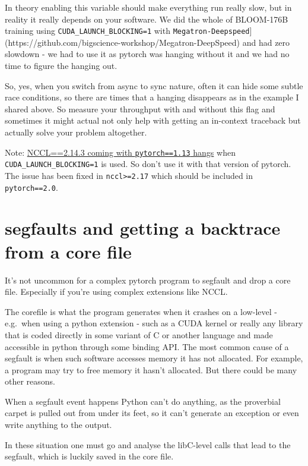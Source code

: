 \documentclass[
]{report}
\begin{document}
In theory enabling this variable should make everything run really slow,
but in reality it really depends on your software. We did the whole of
BLOOM-176B training using \texttt{CUDA\_LAUNCH\_BLOCKING=1} with
\texttt{Megatron-Deepspeed}{]}(https://github.com/bigscience-workshop/Megatron-DeepSpeed)
and had zero slowdown - we had to use it as pytorch was hanging without
it and we had no time to figure the hanging out.

So, yes, when you switch from async to sync nature, often it can hide
some subtle race conditions, so there are times that a hanging
disappears as in the example I shared above. So measure your throughput
with and without this flag and sometimes it might actual not only help
with getting an in-context traceback but actually solve your problem
altogether.

Note: \href{https://github.com/NVIDIA/nccl/issues/750}{NCCL==2.14.3
coming with \texttt{pytorch==1.13} hangs} when
\texttt{CUDA\_LAUNCH\_BLOCKING=1} is used. So don't use it with that
version of pytorch. The issue has been fixed in
\texttt{nccl\textgreater{}=2.17} which should be included in
\texttt{pytorch==2.0}.

\section{segfaults and getting a backtrace from a core
file}\label{segfaults-and-getting-a-backtrace-from-a-core-file}

It's not uncommon for a complex pytorch program to segfault and drop a
core file. Especially if you're using complex extensions like NCCL.

The corefile is what the program generates when it crashes on a
low-level - e.g.~when using a python extension - such as a CUDA kernel
or really any library that is coded directly in some variant of C or
another language and made accessible in python through some binding API.
The most common cause of a segfault is when such software accesses
memory it has not allocated. For example, a program may try to free
memory it hasn't allocated. But there could be many other reasons.

When a segfault event happens Python can't do anything, as the
proverbial carpet is pulled out from under its feet, so it can't
generate an exception or even write anything to the output.

In these situation one must go and analyse the libC-level calls that
lead to the segfault, which is luckily saved in the core file.
\end{document}
